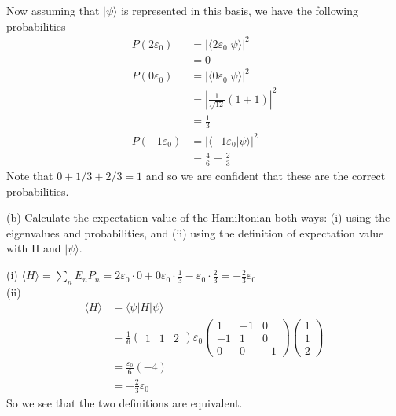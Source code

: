 \documentclass[a4paper, 11pt]{article}
\newcommand{\ket}[1]{|#1\rangle}
\newcommand{\bra}[1]{\langle #1 |}
\newcommand{\braket}[2]{\langle #1 | #2 \rangle}
\newcommand{\expect}[1]{\langle #1 \rangle}
\newenvironment{solution}{%
	\begin{list}{}{%
			\setlength{\topsep}{0pt}%
			\setlength{\leftmargin}{1.5cm}%
			\setlength{\rightmargin}{1.5cm}%
			\setlength{\listparindent}{\parindent}%
			\setlength{\itemindent}{\parindent}%
			\setlength{\parsep}{\parskip}%
		}%
		\item[]}{\end{list}}
\begin{document}
\begin{solution}
\begin{equation*}
			\end{equation*}
		Now assuming that $\ket{\psi}$ is represented in this basis, we have the following probabilities
			\begin{align*}
				P(2\varepsilon_0) &= \left| \braket{2\varepsilon_0}{\psi}\right|^2 \\ 
					&= 0 \\ 
				P(0\varepsilon_0) &= \left| \braket{0\varepsilon_0}{\psi}\right|^2 \\ 
					&= \left|\frac{1}{\sqrt{12}}(1+1)\right|^2 \\ 
					&= \frac{1}{3} \\ 
				P(-1\varepsilon_0) &= \left| \braket{-1\varepsilon_0}{\psi} \right|^2 \\ 
					&= \frac{4}{6} = \frac{2}{3} 
			\end{align*}
		Note that $0 + 1/3 + 2/3 = 1$ and so we are confident that these are the correct probabilities. \\
	\end{solution}

\noindent (b) Calculate the expectation value of the Hamiltonian both ways: (i) using the eigenvalues and probabilities, and (ii) using the definition of expectation value with H and $\ket{\psi}$. \\
	\begin{solution}
		\noindent(i) $\expect{H} = \sum_n E_n P_n = 2\varepsilon_0\cdot 0 + 0\varepsilon_0\cdot \frac{1}{3} - \varepsilon_0\cdot \frac{2}{3} = -\frac{2}{3}\varepsilon_0$ \\ 
		
		\noindent(ii) 
			\begin{align*}
				\expect{H} &= \bra{\psi}H\ket{\psi} \\ 
					&= \frac{1}{6}\begin{pmatrix}1 & 1 & 2\end{pmatrix}\varepsilon_0\begin{pmatrix}
					 1 & -1 & 0 \\ 
					 -1 & 1 & 0 \\ 
					 0 & 0 & -1
					\end{pmatrix}\begin{pmatrix}1 \\ 1\\ 2\end{pmatrix} \\ 
					&= \frac{\varepsilon_0}{6}(-4) \\ 
					&= -\frac{2}{3}\varepsilon_0
			\end{align*}
		So we see that the two definitions are equivalent. \\
	\end{solution}
\end{document}

